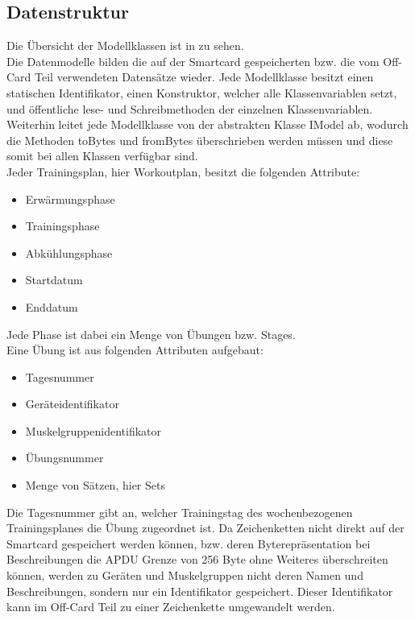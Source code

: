 \subsection{Datenstruktur}
\label{subsec:3.1}
Die Übersicht der Modellklassen ist in  zu sehen.
\\

Die Datenmodelle bilden die auf der Smartcard gespeicherten bzw. die vom Off-Card Teil verwendeten Datensätze wieder.
Jede Modellklasse besitzt einen statischen Identifikator, einen Konstruktor, welcher alle Klassenvariablen setzt, und öffentliche lese- und Schreibmethoden der einzelnen Klassenvariablen.
Weiterhin leitet jede Modellklasse von der abstrakten Klasse IModel ab, wodurch die Methoden toBytes und fromBytes überschrieben werden müssen und diese somit bei allen Klassen verfügbar sind.
\\

Jeder Trainingsplan, hier Workoutplan, besitzt die folgenden Attribute:
\begin{itemize}
\item Erwärmungsphase
\item Trainingsphase
\item Abkühlungsphase
\item Startdatum
\item Enddatum
\end{itemize}
Jede Phase ist dabei ein Menge von Übungen bzw. Stages.
\\

Eine Übung ist aus folgenden Attributen aufgebaut:
\begin{itemize}
\item Tagesnummer
\item Geräteidentifikator
\item Muskelgruppenidentifikator
\item Übungsnummer
\item Menge von Sätzen, hier Sets
\end{itemize}
Die Tagesnummer gibt an, welcher Trainingstag des wochenbezogenen Trainingsplanes die Übung zugeordnet ist.
Da Zeichenketten nicht direkt auf der Smartcard gespeichert werden können, bzw. deren Byterepräsentation bei Beschreibungen die APDU Grenze von 256 Byte ohne Weiteres überschreiten können, werden zu Geräten und Muskelgruppen nicht deren Namen und Beschreibungen, sondern nur ein Identifikator gespeichert. Dieser Identifikator kann im Off-Card Teil zu einer Zeichenkette umgewandelt werden.
\\

